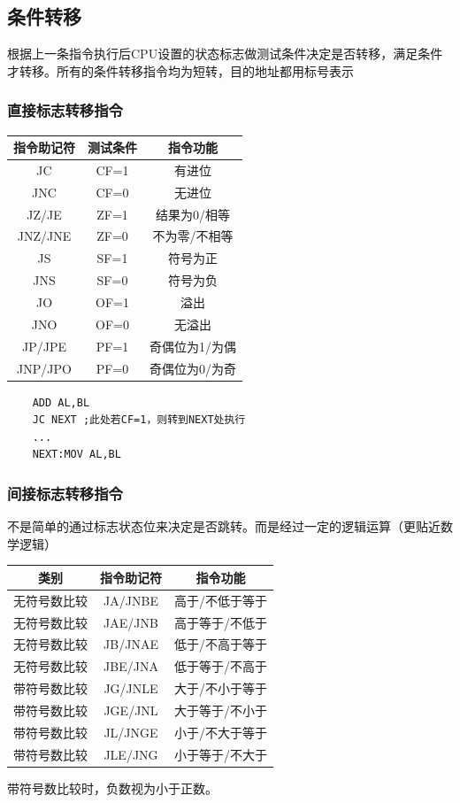 \subsection{条件转移}
根据上一条指令执行后CPU设置的状态标志做测试条件决定是否转移，满足条件才转移。所有的条件转移指令均为短转，目的地址都用标号表示
\subsubsection{直接标志转移指令}
\begin{table}[H]
    \centering 
    \begin{tabular}{ccc}
        \hline 
        指令助记符 & 测试条件 & 指令功能 \\ \hline
        JC   &      CF=1& 有进位 \\
        JNC    & CF=0 &无进位\\
        JZ/JE& ZF=1 &结果为0/相等\\
        JNZ/JNE &ZF=0 &不为零/不相等\\
        JS& SF=1 &符号为正\\
        JNS& SF=0 &符号为负\\
        JO &OF=1& 溢出\\
        JNO& OF=0 &无溢出\\
        JP/JPE& PF=1 &奇偶位为1/为偶\\
        JNP/JPO& PF=0 &奇偶位为0/为奇\\ \hline
    \end{tabular}
\end{table}
\begin{lstlisting}
    ADD AL,BL
    JC NEXT ;此处若CF=1，则转到NEXT处执行
    ... 
    NEXT:MOV AL,BL
\end{lstlisting}
\subsubsection{间接标志转移指令}
不是简单的通过标志状态位来决定是否跳转。而是经过一定的逻辑运算（更贴近数学逻辑）
\begin{table}[H]
    \centering 
    \begin{tabular}{ccc}
        \hline 
        类别 & 指令助记符 & 指令功能 \\ \hline
        无符号数比较 & JA/JNBE & 高于/不低于等于\\
        无符号数比较 & JAE/JNB&高于等于/不低于\\
        无符号数比较 & JB/JNAE&低于/不高于等于\\
        无符号数比较 & JBE/JNA&低于等于/不高于\\
        带符号数比较 & JG/JNLE&大于/不小于等于\\
        带符号数比较 & JGE/JNL&大于等于/不小于\\
        带符号数比较 & JL/JNGE&小于/不大于等于\\
        带符号数比较 & JLE/JNG&小于等于/不大于\\ \hline
    \end{tabular}
\end{table}
带符号数比较时，负数视为小于正数。
